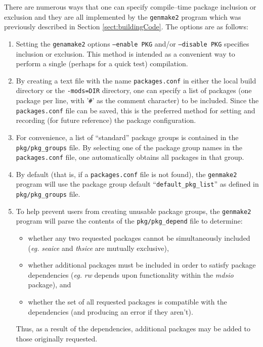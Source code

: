 There are numerous ways that one can specify compile--time package
inclusion or exclusion and they are all implemented by the
\texttt{genmake2} program which was previously described in Section
\ref{sect:buildingCode}.  The options are as follows:
\begin{enumerate}
\item Setting the \texttt{genamake2} options \texttt{--enable PKG}
  and/or \texttt{--disable PKG} specifies inclusion or exclusion.
  This method is intended as a convenient way to perform a single
  (perhaps for a quick test) compilation.
  
\item By creating a text file with the name \texttt{packages.conf} in
  either the local build directory or the \texttt{-mods=DIR}
  directory, one can specify a list of packages (one package per line,
  with '\texttt{\#}' as the comment character) to be included.  Since
  the \texttt{packages.conf} file can be saved, this is the preferred
  method for setting and recording (for future reference) the package
  configuration.
  
\item For convenience, a list of ``standard'' package groups is
  contained in the \texttt{pkg/pkg\_groups} file.  By selecting one of
  the package group names in the \texttt{packages.conf} file, one
  automatically obtains all packages in that group.

\item By default (that is, if a \texttt{packages.conf} file is not
  found), the \texttt{genmake2} program will use the
  package group default ``\texttt{default\_pkg\_list}'' as defined 
  in \texttt{pkg/pkg\_groups} file.

\item To help prevent users from creating unusable package groups, the
  \texttt{genmake2} program will parse the contents of the
  \texttt{pkg/pkg\_depend} file to determine:
  \begin{itemize}
  \item whether any two requested packages cannot be simultaneously
    included (\textit{eg.} \textit{seaice} and \textit{thsice} are
    mutually exclusive),
  \item whether additional packages must be included in order to
    satisfy package dependencies (\textit{eg.} \textit{rw} depends
    upon functionality within the \textit{mdsio} package), and
  \item whether the set of all requested packages is compatible with
    the dependencies (and producing an error if they aren't).
  \end{itemize}
  Thus, as a result of the dependencies, additional packages may be
  added to those originally requested.

\end{enumerate}


